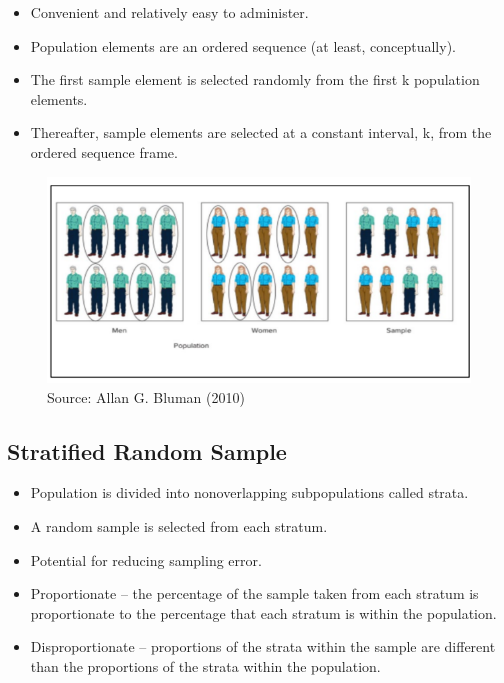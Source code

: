 \documentclass[
  a4paper,
  DIV=11,
  numbers=noendperiod,
  oneside]{scrreprt}
\providecommand{\tightlist}{%
  \setlength{\itemsep}{0pt}\setlength{\parskip}{0pt}}\usepackage{longtable,booktabs,array}
\begin{document}
\begin{itemize}
\tightlist
\item
  Convenient and relatively easy to administer.
\item
  Population elements are an ordered sequence (at least, conceptually).
\item
  The first sample element is selected randomly from the first k
  population elements.
\item
  Thereafter, sample elements are selected at a constant interval, k,
  from the ordered sequence frame.
\end{itemize}

\begin{figure}

{\centering \includegraphics[width=5.20833in,height=\textheight]{images/ch1/Picture14.png}

}

\caption{Source: Allan G. Bluman (2010)}

\end{figure}

\hypertarget{stratified-random-sample}{%
\subsection{Stratified Random Sample}\label{stratified-random-sample}}

\begin{itemize}
\tightlist
\item
  Population is divided into nonoverlapping subpopulations called
  strata.
\item
  A random sample is selected from each stratum.
\item
  Potential for reducing sampling error.
\item
  Proportionate -- the percentage of the sample taken from each stratum
  is proportionate to the percentage that each stratum is within the
  population.
\item
  Disproportionate -- proportions of the strata within the sample are
  different than the proportions of the strata within the population.
\end{itemize}
\end{document}
